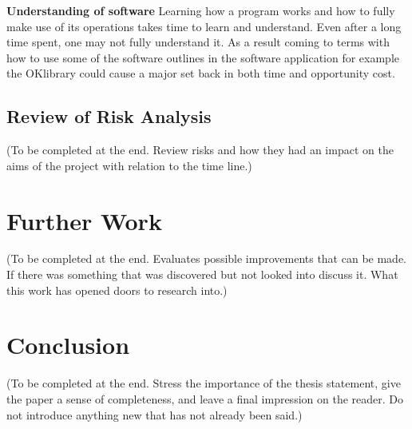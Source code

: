 \documentclass[11pt,a4paper]{report}
\begin{document}
\textbf{Understanding of software}
Learning how a program works and how to fully make use of its operations takes time to learn and understand. Even after a long time spent, one may not fully understand it. As a result coming to terms with how to use some of the software outlines in the software application for example the OKlibrary could cause a major set back in both time and opportunity cost.

\subsection{Review of Risk Analysis}
(To be completed at the end. Review risks and how they had an impact on the aims of the project with relation to the time line.)

\section{Further Work}
(To be completed at the end. Evaluates possible improvements that can be made. If there was something that was discovered but not looked into discuss it. What this work has opened doors to research into.)

\section{Conclusion}
(To be completed at the end. Stress the importance of the thesis statement, give the paper a sense of completeness, and
leave a final impression on the reader. Do not introduce anything new that has not already been said.)



\nocite{*}

\end{document}
